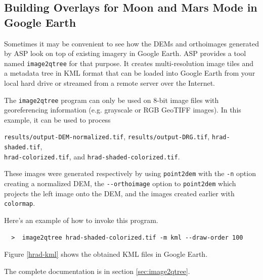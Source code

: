 \newpage
\subsection{Building Overlays for Moon and Mars Mode in Google Earth}

Sometimes it may be convenient to see how the DEMs and orthoimages
generated by ASP look on top of existing imagery in Google Earth. ASP
provides a tool named \texttt{image2qtree} for that purpose. It creates
multi-resolution image tiles and a metadata tree in KML format that can
be loaded into Google Earth from your local hard drive or streamed from
a remote server over the Internet.

The \texttt{image2qtree} program can only be used on 8-bit image files
with georeferencing information (e.g. grayscale or RGB GeoTIFF
images). In this example, it can be used to process

\texttt{results/output-DEM-normalized.tif}, \texttt{results/output-DRG.tif}, \texttt{hrad-shaded.tif}, \\
\texttt{hrad-colorized.tif}, and \texttt{hrad-shaded-colorized.tif}.

These images were generated respectively by using \texttt{point2dem}
with the \texttt{-n} option creating a normalized DEM, the
\texttt{-\/-orthoimage} option to \texttt{point2dem} which projects the
left image onto the DEM, and the images created earlier with
\texttt{colormap}.

Here's an example of how to invoke this program.
\begin{verbatim}
  >  image2qtree hrad-shaded-colorized.tif -m kml --draw-order 100
\end{verbatim}

Figure \ref{hrad-kml} shows the obtained KML files in Google Earth.

The complete documentation is in section \ref{sec:image2qtree}.

